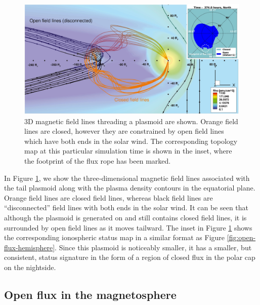 \begin{figure}
    \centering
    \includegraphics[width=\textwidth]{images4/plasmoid-3d-inset.jpg}
    \caption{3D magnetic field lines threading a plasmoid are shown. Orange field lines are closed, however they are constrained by open field lines which have both ends in the solar wind. The corresponding topology map at this particular simulation time is shown in the inset, where the footprint of the flux rope has been marked.}
    \label{fig:plasmoid-3d-inset}
\end{figure}

In Figure \ref{fig:plasmoid-3d-inset}, we show the three‐dimensional magnetic field lines associated with the tail plasmoid along with the plasma density contours in the equatorial plane. Orange field lines are closed field lines, whereas black field lines are “disconnected” field lines with both ends in the solar wind. It can be seen that although the plasmoid is generated on and still contains closed field lines, it is surrounded by open field lines as it moves tailward. The inset in Figure \ref{fig:plasmoid-3d-inset} shows the corresponding ionospheric status map in a similar format as Figure \ref{fig:open-flux-hemisphere}. Since this plasmoid is noticeably smaller, it has a smaller, but consistent, status signature in the form of a region of closed flux in the polar cap on the nightside. 

\subsection{Open flux in the magnetosphere}

